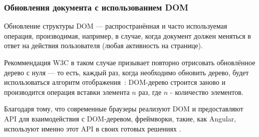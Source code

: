 %
%

\subsubsection{Обновления документа с использованием DOM}

Обновление структуры DOM --- распространённая и часто используемая операция, производимая, например, в случае, когда документ должен меняться в ответ на действия пользователя (любая активность на странице).

Рекоммендация W3C в таком случае призывает повторно отрисовать обновлённое дерево с нуля --- то есть, каждый раз, когда необходимо обновить дерево, будет использоваться алгоритм отображения~\cite{reflow}: DOM-дерево строится заново и производится операция вставки элемента $n$ раз, где $n$ - количество элементов.

Благодаря тому, что современные браузеры реализуют DOM и предоставляют API для взаимодействия с DOM-деревом, фреймворки, такие, как Angular, используют именно этот API в своих готовых решениях \cite{angular}. 

%
%
%

